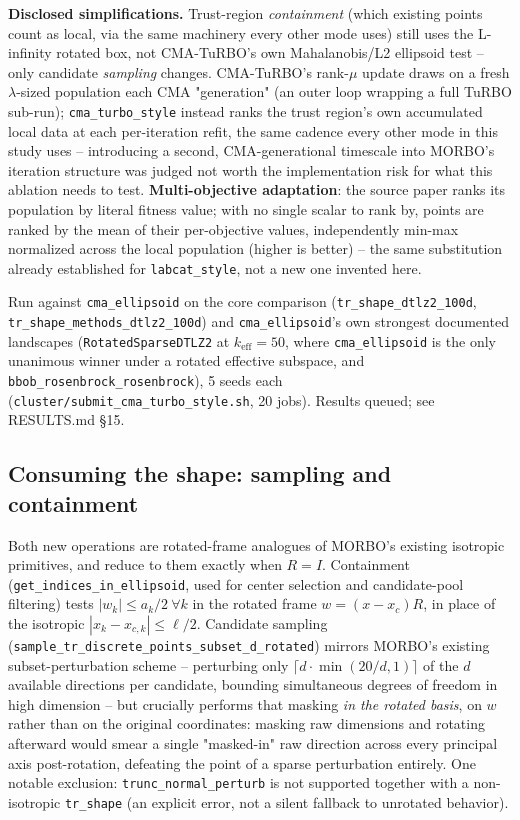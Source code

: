 \documentclass[11pt]{article}
\begin{document}
\textbf{Disclosed simplifications.} Trust-region \emph{containment} (which
existing points count as local, via the same machinery every other mode
uses) still uses the L-infinity rotated box, not CMA-TuRBO's own
Mahalanobis/L2 ellipsoid test -- only candidate \emph{sampling} changes.
CMA-TuRBO's rank-$\mu$ update draws on a fresh $\lambda$-sized population
each CMA "generation" (an outer loop wrapping a full TuRBO sub-run);
\texttt{cma\_turbo\_style} instead ranks the trust region's own
accumulated local data at each per-iteration refit, the same cadence every
other mode in this study uses -- introducing a second, CMA-generational
timescale into MORBO's iteration structure was judged not worth the
implementation risk for what this ablation needs to test.
\textbf{Multi-objective adaptation}: the source paper ranks its population
by literal fitness value; with no single scalar to rank by, points are
ranked by the mean of their per-objective values, independently min-max
normalized across the local population (higher is better) -- the same
substitution already established for \texttt{labcat\_style}, not a new one
invented here.

Run against \texttt{cma\_ellipsoid} on the core comparison
(\texttt{tr\_shape\_dtlz2\_100d}, \texttt{tr\_shape\_methods\_dtlz2\_100d})
and \texttt{cma\_ellipsoid}'s own strongest documented landscapes
(\texttt{RotatedSparseDTLZ2} at $k_{\mathrm{eff}}{=}50$, where
\texttt{cma\_ellipsoid} is the only unanimous winner under a rotated
effective subspace, and \texttt{bbob\_rosenbrock\_rosenbrock}), 5 seeds
each (\texttt{cluster/submit\_cma\_turbo\_style.sh}, 20 jobs). Results
queued; see RESULTS.md \S15.

\subsection{Consuming the shape: sampling and containment}

Both new operations are rotated-frame analogues of MORBO's existing
isotropic primitives, and reduce to them exactly when $R=I$. Containment
(\texttt{get\_indices\_in\_ellipsoid}, used for center selection and
candidate-pool filtering) tests $|w_k| \le a_k/2\ \forall k$ in the rotated
frame $w = (x-x_c)R$, in place of the isotropic $|x_k - x_{c,k}| \le
\ell/2$. Candidate sampling
(\texttt{sample\_tr\_discrete\_points\_subset\_d\_rotated}) mirrors
MORBO's existing subset-perturbation scheme -- perturbing only
$\lceil d \cdot \min(20/d, 1)\rceil$ of the $d$ available directions per
candidate, bounding simultaneous degrees of freedom in high dimension --
but crucially performs that masking \emph{in the rotated basis}, on $w$
rather than on the original coordinates: masking raw dimensions and
rotating afterward would smear a single "masked-in" raw direction across
every principal axis post-rotation, defeating the point of a sparse
perturbation entirely. One notable exclusion: \texttt{trunc\_normal\_perturb}
is not supported together with a non-isotropic \texttt{tr\_shape} (an
explicit error, not a silent fallback to unrotated behavior).
\end{document}
